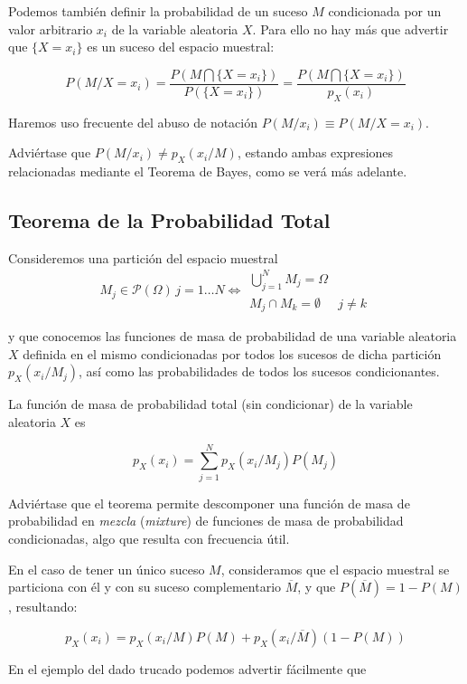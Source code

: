 \documentclass[11pt]{article}
\begin{document}
    Podemos también definir la probabilidad de un suceso \(M\) condicionada
por un valor arbitrario \(x_i\) de la variable aleatoria \(X\). Para
ello no hay más que advertir que \(\{X=x_i\}\) es un suceso del espacio
muestral:

\[P(M/X=x_i)= \frac{P(M \bigcap \{X=x_i\})}{P(\{X=x_i\})}=\frac{P(M \bigcap \{X=x_i\})}{p_X(x_i)}\]

Haremos uso frecuente del abuso de notación
\(P(M/x_i)\equiv P(M/X=x_i)\).

Adviértase que \(P(M/x_i) \neq p_X(x_i/M)\), estando ambas expresiones
relacionadas mediante el Teorema de Bayes, como se verá más adelante.

    \hypertarget{teorema-de-la-probabilidad-total}{%
\subsection*{Teorema de la Probabilidad
Total}\label{teorema-de-la-probabilidad-total}}

Consideremos una partición del espacio muestral \[
M_j \in \mathscr{P}(\Omega) \, j=1\ldots N\iff  \begin{matrix}
  \bigcup_{j=1}^N M_j = \Omega &  \\
  M_j \cap M_k = \emptyset & j\neq k  
 \end{matrix}
\]

y que conocemos las funciones de masa de probabilidad de una variable
aleatoria \(X\) definida en el mismo condicionadas por todos los sucesos
de dicha partición \(p_X(x_i/M_j)\), así como las probabilidades de
todos los sucesos condicionantes.

La función de masa de probabilidad total (sin condicionar) de la
variable aleatoria \(X\) es

\[p_X(x_i) = \sum_{j=1}^N p_X(x_i/M_j)P(M_j)\]

    Adviértase que el teorema permite descomponer una función de masa de
probabilidad en \emph{mezcla} (\emph{mixture}) de funciones de masa de
probabilidad condicionadas, algo que resulta con frecuencia útil.

En el caso de tener un único suceso \(M\), consideramos que el espacio
muestral se particiona con él y con su suceso complementario
\(\overline M\), y que \(P(\overline M)=1-P(M)\), resultando:

\[p_X(x_i)=p_X(x_i/M)P(M)+p_X(x_i/\overline M)(1-P(M))\]

En el ejemplo del dado trucado podemos advertir fácilmente que
\end{document}
